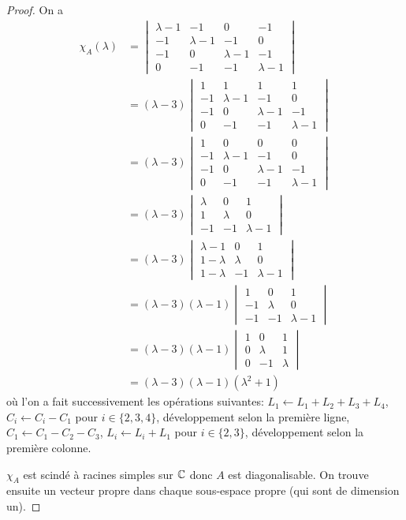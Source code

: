\documentclass[12pt]{article}
\begin{document}
\begin{proof}
	On a 
	\begin{align}
		\chi_{A}(\lambda)
		&=
		\begin{vmatrix}
			\lambda-1	&-1			&0			&-1\\
			-1			&\lambda-1	&-1			&0\\
			-1			&0			&\lambda-1	&-1\\
			0			&-1			&-1			&\lambda-1
		\end{vmatrix}\\
		&=(\lambda-3)
		\begin{vmatrix}
			1	&1			&1			&1\\
			-1			&\lambda-1	&-1			&0\\
			-1			&0			&\lambda-1	&-1\\
			0			&-1			&-1			&\lambda-1
		\end{vmatrix}\\
		&=(\lambda-3)
		\begin{vmatrix}
			1	&0			&0			&0\\
			-1			&\lambda-1	&-1			&0\\
			-1			&0			&\lambda-1	&-1\\
			0			&-1			&-1			&\lambda-1
		\end{vmatrix}\\
		&=(\lambda-3)
		\begin{vmatrix}
			\lambda &0 &1\\
			1 &\lambda &0\\
			-1 &-1 &\lambda-1
		\end{vmatrix}\\
		&=(\lambda-3)
		\begin{vmatrix}
			\lambda-1 &0 &1\\
			1-\lambda &\lambda &0\\
			1-\lambda &-1 &\lambda-1
		\end{vmatrix}\\
		&=(\lambda-3)(\lambda-1)
		\begin{vmatrix}
			1 &0 &1\\
			-1 &\lambda &0\\
			-1 &-1 &\lambda-1
		\end{vmatrix}\\
		&=(\lambda-3)(\lambda-1)
		\begin{vmatrix}
			1 &0 &1\\
			0 &\lambda &1\\
			0 &-1 &\lambda
		\end{vmatrix}\\
		&=(\lambda-3)(\lambda-1)(\lambda^{2}+1)
	\end{align}
	où l'on a fait successivement les opérations suivantes: $L_{1}\leftarrow L_{1}+L_{2}+L_{3}+L_{4}$, $C_{i}\leftarrow C_{i}-C_{1}$ pour $i\in\lbrace2,3,4\rbrace$, développement selon la première ligne, $C_{1}\leftarrow C_{1}-C_{2}-C_{3}$, $L_{i}\leftarrow L_{i}+L_{1}$ pour $i\in\lbrace2,3\rbrace$, développement selon la première colonne.

	$\chi_{A}$ est scindé à racines simples sur $\mathbb{C}$ donc $A$ est diagonalisable. On trouve ensuite un vecteur propre dans chaque sous-espace propre (qui sont de dimension un).
\end{proof}
\end{document}
